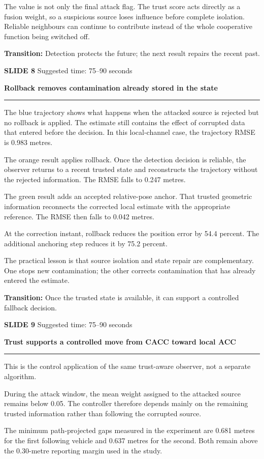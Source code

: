 \documentclass[11pt,a4paper]{article}
\newcommand{\slidetitle}[3]{%
  \clearpage
  {\color{BrandCyan}\large\bfseries SLIDE #1}\hfill
  {\color{Muted}\small Suggested time: #3}\par
  \vspace{0.18cm}
  {\color{BrandBlue}\LARGE\bfseries #2}\par
  \vspace{0.20cm}
  {\color{BrandMagenta}\rule{1.1cm}{1.2pt}}\par
  \vspace{0.12cm}
}
\newcommand{\transition}[1]{%
  \vfill
  \colorbox{Panel}{%
    \parbox{\dimexpr\textwidth-2\fboxsep\relax}{%
      \raggedright\textbf{Transition:} #1}}
}
\begin{document}
The value is not only the final attack flag. The trust score acts directly as a fusion weight, so a suspicious source loses influence before complete isolation. Reliable neighbours can continue to contribute instead of the whole cooperative function being switched off.

\transition{Detection protects the future; the next result repairs the recent past.}

\slidetitle{8}{Rollback removes contamination already stored in the state}{75--90 seconds}

The blue trajectory shows what happens when the attacked source is rejected but no rollback is applied. The estimate still contains the effect of corrupted data that entered before the decision. In this local-channel case, the trajectory RMSE is 0.983 metres.

The orange result applies rollback. Once the detection decision is reliable, the observer returns to a recent trusted state and reconstructs the trajectory without the rejected information. The RMSE falls to 0.247 metres.

The green result adds an accepted relative-pose anchor. That trusted geometric information reconnects the corrected local estimate with the appropriate reference. The RMSE then falls to 0.042 metres.

At the correction instant, rollback reduces the position error by 54.4 percent. The additional anchoring step reduces it by 75.2 percent.

The practical lesson is that source isolation and state repair are complementary. One stops new contamination; the other corrects contamination that has already entered the estimate.

\transition{Once the trusted state is available, it can support a controlled fallback decision.}

\slidetitle{9}{Trust supports a controlled move from CACC toward local ACC}{75--90 seconds}

This is the control application of the same trust-aware observer, not a separate algorithm.

During the attack window, the mean weight assigned to the attacked source remains below 0.05. The controller therefore depends mainly on the remaining trusted information rather than following the corrupted source.

The minimum path-projected gaps measured in the experiment are 0.681 metres for the first following vehicle and 0.637 metres for the second. Both remain above the 0.30-metre reporting margin used in the study.
\end{document}
